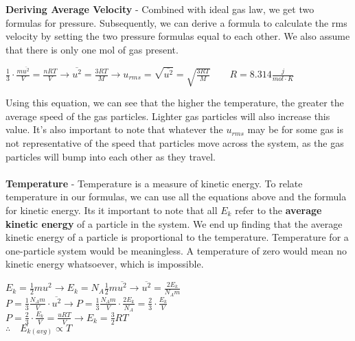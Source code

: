 \documentclass{article}
\begin{document}
	\noindent\textbf{Deriving Average Velocity} - Combined with ideal gas law, we get two formulas for pressure. Subsequently, we can derive a formula to calculate the rms velocity by setting the two pressure formulas equal to each other. We also assume that there is only one mol of gas present.
	\begin{qq}
		
		\begin{center}
			$\frac{1}{3}\cdot\frac{m\overline{u^2}}{V}=\frac{nRT}{V} \longrightarrow \overline{u^2}=\frac{3RT}{M}\longrightarrow u_{rms}=\sqrt{\overline{u^2}}=\sqrt{\frac{3RT}{M}} \qquad R=8.314\frac{j}{mol\cdot K}$
		\end{center}
		
		
	\end{qq}
	
	\vspace{3pt}
	\noindent Using this equation, we can see that the higher the temperature, the greater the average speed of the gas particles. Lighter gas particles will also increase this value. It's also important to note that whatever the $u_{rms}$ may be for some gas is not representative of the speed that particles move across the system, as the gas particles will bump into each other as they travel.\\
	\\
	\textbf{Temperature} - Temperature is a measure of kinetic energy. To relate temperature in our formulas, we can use all the equations above and the formula for kinetic energy. Its it important to note that all $E_k$ refer to the \textbf{average kinetic energy} of a particle in the system. We end up finding that the average kinetic energy of a particle is proportional to the temperature. Temperature for a one-particle system would be meaningless. A temperature of zero would mean no kinetic energy whatsoever, which is impossible.
	\begin{qq}
		
		\begin{center}
			$E_k=\frac{1}{2}mu^2\longrightarrow E_k=N_A\frac{1}{2}m\overline{u^2}\longrightarrow \overline{u^2}=\frac{2E_k}{N_Am}$\\
			\vspace{5pt}
			$P=\frac{1}{3}\frac{N_Am}{V}\cdot\overline{u^2}\longrightarrow P=\frac{1}{3}\frac{N_Am}{V}\cdot\frac{2E_k}{N_A}=\frac{2}{3}\cdot\frac{E_k}{V}$\\
			\vspace{5pt}
			$P=\frac{2}{3}\cdot\frac{E_k}{V}=\frac{uRT}{V}\longrightarrow E_k=\frac{3}{2}RT$\\
			\vspace{5pt}
			$\therefore \quad E_{k(avg)}\propto T$
		\end{center}
		
	\end{qq}
	\pagebreak
	
\end{document}
